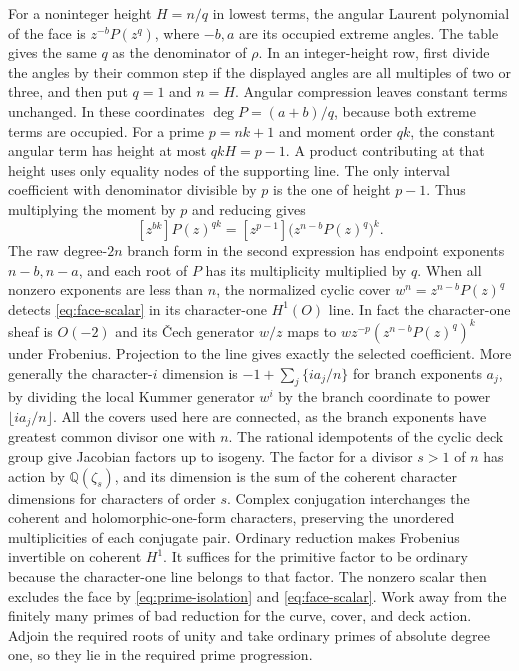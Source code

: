 For a noninteger height \(H=n/q\) in lowest terms, the angular Laurent
polynomial of the face is \(z^{-b}P(z^q)\), where \(-b,a\) are its occupied
extreme angles. The table gives the same \(q\) as the denominator of \(\rho\).
In an integer-height row, first divide the angles by their common step if
the displayed angles are all multiples of two or three, and then put
\(q=1\) and \(n=H\). Angular compression leaves constant terms unchanged.
In these coordinates \(\deg P=(a+b)/q\), because both extreme terms
are occupied. For a prime \(p=nk+1\) and moment order \(qk\), the constant angular term has
height at most \(qkH=p-1\). A product contributing at that height uses
only equality nodes of the supporting line. The only interval coefficient
with denominator divisible by \(p\) is the one of height \(p-1\). Thus
multiplying the moment by \(p\) and reducing gives
\[
 [z^{bk}]P(z)^{qk}=[z^{p-1}]\bigl(z^{n-b}P(z)^q\bigr)^k.
\tag{*}\label{eq:face-scalar}
\]
The raw degree-\(2n\) branch form in the second expression has endpoint
exponents \(n-b,n-a\), and each root of \(P\) has its multiplicity multiplied
by \(q\). When all nonzero exponents are less than \(n\), the normalized
cyclic cover \(w^n=z^{n-b}P(z)^q\) detects \eqref{eq:face-scalar} in its
character-one \(H^1(O)\) line. In fact the character-one sheaf is \(O(-2)\)
and its \v{C}ech generator \(w/z\) maps to
\(wz^{-p}(z^{n-b}P(z)^q)^k\) under Frobenius. Projection to the line gives
exactly the selected coefficient. More generally the character-\(i\)
dimension is \(-1+\sum_j\{i a_j/n\}\) for branch exponents \(a_j\), by
dividing the local Kummer generator \(w^i\) by the branch coordinate to
power \(\lfloor i a_j/n\rfloor\). All the covers used here are connected,
as the branch exponents have greatest common divisor one with \(n\).
The rational idempotents of the cyclic deck group give Jacobian factors
up to isogeny. The factor for a divisor \(s>1\) of \(n\) has action by
\(\mathbb Q(\zeta_s)\), and its dimension is the sum of the coherent
character dimensions for characters of order \(s\). Complex conjugation
interchanges the coherent and holomorphic-one-form characters, preserving
the unordered multiplicities of each conjugate pair.
Ordinary reduction makes Frobenius invertible on coherent \(H^1\).
It suffices for the primitive factor to be ordinary because the
character-one line belongs to that factor. The nonzero scalar then
excludes the face by \eqref{eq:prime-isolation} and \eqref{eq:face-scalar}.
Work away from the finitely many primes of bad reduction for the curve,
cover, and deck action. Adjoin the required roots of unity and take
ordinary primes of absolute degree one, so they lie in the required
prime progression.

